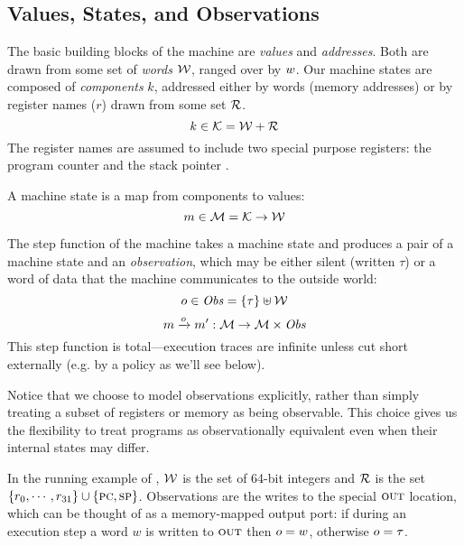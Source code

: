 \documentclass[acmsmall,review,anonymous]{acmart}\settopmatter{printfolios=true,printccs=false,printacmref=false}
\begin{document}
\subsection{Values, States, and Observations}

The basic building blocks of the machine are {\em values} and {\em
  addresses}. Both are drawn from some set of {\em words}
${\mathcal W}$, ranged over by $w$.
%
Our machine states are composed of {\em components} $k$, addressed either by
words (memory addresses) or by register names ($r$) drawn from some set
${\mathcal R}$.
%
    \[k \in {\mathcal K} = {\mathcal W} + {\mathcal R} \]
%
The register names are assumed to include two special purpose registers: the
program counter {\PCname} and the stack pointer \SP.

A machine state is a map from components to values:
%
\[m \in {\mathcal M} = {\mathcal K} \rightarrow {\mathcal W}\]

The step function of the machine takes a machine state and produces a
pair of a machine state and an {\em observation}, which may be either
silent (written $\tau$) or a word of data that the machine
communicates to the outside world:
%
\[o \in \mathit{Obs} = \{\tau\} \uplus {\mathcal W}\]
\[m \xrightarrow{o} m' : {\mathcal M} \rightarrow {\mathcal M} \times \mathit{Obs} \]
%
This step function is total---execution traces are infinite unless cut
short externally (e.g. by a policy as we'll see below).

Notice that we choose to model observations explicitly, rather than simply treating
a subset of registers or memory as being observable.  This choice gives
us the flexibility to treat programs as observationally equivalent even when
their internal states may differ.

In the running example of ,
${\mathcal W}$ is the
set of 64-bit integers and ${\mathcal R}$ is the set $\{r_0, \cdots, r_{31}\}
\cup \{\textsc{pc},\textsc{sp}\}$. Observations are the writes to the
  special $\textsc{out}$ location, which can be thought of as a memory-mapped
  output port: if during an execution step a word $w$ is
written to $\textsc{out}$ then $o = w$, otherwise $o = \tau$.
\end{document}
